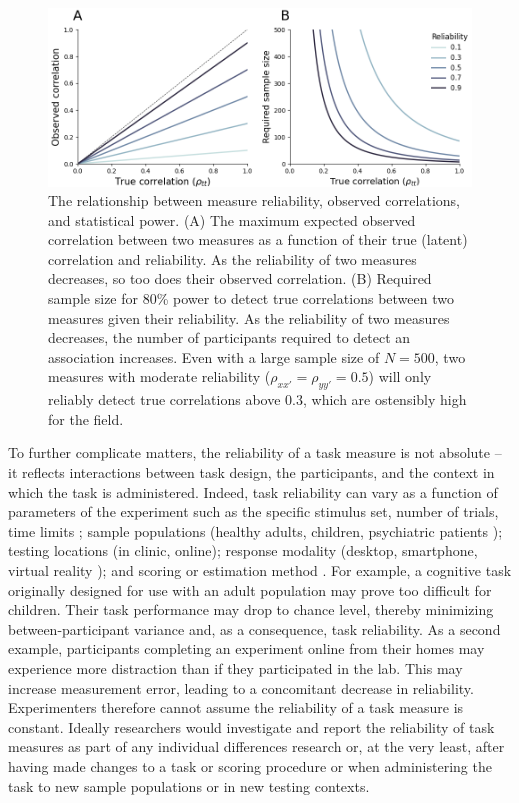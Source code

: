\documentclass[a4paper,12pt]{article}
\begin{document}
\begin{figure}[tp]
    \centering
    \includegraphics[width=1.0\textwidth]{figures/fig01.png}
    \caption{\small The relationship between measure reliability, observed correlations, and statistical power. (A) The maximum expected observed correlation between two measures as a function of their true (latent) correlation and reliability. As the reliability of two measures decreases, so too does their observed correlation. (B) Required sample size for 80\% power to detect true correlations between two measures given their reliability. As the reliability of two measures decreases, the number of participants required to detect an association increases. Even with a large sample size of $N=500$, two measures with moderate reliability ($\rho_{xx'} = \rho_{yy'} = 0.5$) will only reliably detect true correlations above $0.3$, which are ostensibly high for the field.}
    \label{fig:fig01}
\end{figure}


To further complicate matters, the reliability of a task measure is not absolute -- it reflects interactions between task design, the participants, and the context in which the task is administered. Indeed, task reliability can vary as a function of parameters of the experiment such as the specific stimulus set, number of trials, time limits \cite{paap2016role, cooper2017role}; sample populations (healthy adults, children, psychiatric patients \cite{arnon2020current, cooper2017role}); testing locations (in clinic, online); response modality (desktop, smartphone, virtual reality \cite{pronk2022can, bruder2021reliability}); and scoring or estimation method \cite{Rouder2019-am, haines2020learning}. For example, a cognitive task originally designed for use with an adult population may prove too difficult for children. Their task performance may drop to chance level, thereby minimizing between-participant variance and, as a consequence, task reliability. As a second example, participants completing an experiment online from their homes may experience more distraction than if they participated in the lab. This may increase measurement error, leading to a concomitant decrease in reliability. Experimenters therefore cannot assume the reliability of a task measure is constant. Ideally researchers would investigate and report the reliability of task measures as part of any individual differences research or, at the very least, after having made changes to a task or scoring procedure or when administering the task to new sample populations or in new testing contexts.
\end{document}

